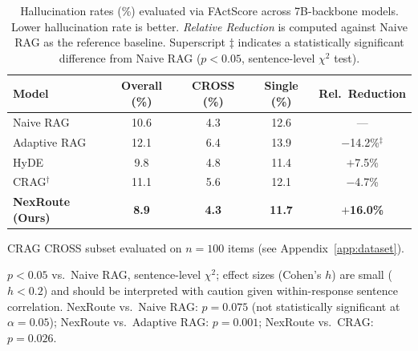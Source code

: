 \begin{table}[t]
\centering
\caption{Hallucination rates (\%) evaluated via FActScore across 7B-backbone models.
  Lower hallucination rate is better.
  \textit{Relative Reduction} is computed against Naive RAG as the reference baseline.
  Superscript $\ddagger$ indicates a statistically significant difference from Naive RAG
  ($p < 0.05$, sentence-level $\chi^2$ test).}
\label{tab:factscore_baselines}
\setlength{\tabcolsep}{8pt}
\begin{tabular}{lcccc}
\toprule
\textbf{Model}
  & \textbf{Overall (\%)}
  & \textbf{CROSS (\%)}
  & \textbf{Single (\%)}
  & \textbf{Rel.\ Reduction} \\
\midrule
Naive RAG         & 10.6 & 4.3 & 12.6 & ---                  \\
Adaptive RAG      & 12.1 & 6.4 & 13.9 & $-$14.2\%$^\ddagger$ \\
HyDE              &  9.8 & 4.8 & 11.4 & $+$7.5\%              \\
CRAG$^\dagger$    & 11.1 & 5.6 & 12.1 & $-$4.7\%              \\
\textbf{NexRoute (Ours)} & \textbf{8.9} & \textbf{4.3} & \textbf{11.7}
  & $\boldsymbol{+}$\textbf{16.0\%} \\
\bottomrule
\end{tabular}
\begin{tablenotes}[flushleft]\footnotesize
  \item[$\dagger$] CRAG CROSS subset evaluated on $n{=}100$ items
    (see Appendix~\ref{app:dataset}).
  \item[$\ddagger$] $p < 0.05$ vs.\ Naive RAG, sentence-level $\chi^2$; effect
    sizes (Cohen's $h$) are small ($h < 0.2$) and should be interpreted
    with caution given within-response sentence correlation.
    NexRoute vs.\ Naive RAG: $p{=}0.075$ (not statistically significant at
    $\alpha{=}0.05$); NexRoute vs.\ Adaptive RAG: $p{=}0.001$;
    NexRoute vs.\ CRAG: $p{=}0.026$.
\end{tablenotes}
\end{table}

